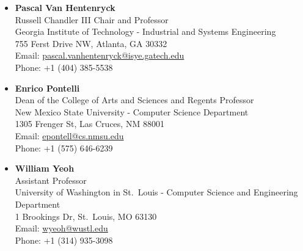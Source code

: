 

\begin{itemize}
\item \textbf{Pascal Van Hentenryck}\\ 
Russell Chandler III Chair and Professor\\
Georgia Institute of Technology - Industrial and Systems Engineering\\
755 Ferst Drive NW, Atlanta, GA 30332\\
Email: \url{pascal.vanhentenryck@isye.gatech.edu}\\
Phone: +1 (404) 385-5538

\item \textbf{Enrico Pontelli}\\ 
Dean of the College of Arts and Sciences and Regents Professor\\ 
New Mexico State University - Computer Science Department\\
1305 Frenger St, Las Cruces, NM 88001\\
Email: \url{epontell@cs.nmsu.edu}\\
Phone: +1 (575) 646-6239 

\item \textbf{William Yeoh}\\ 
Assistant Professor\\ 
University of Washington in St.~Louis - Computer Science and Engineering Department\\ 
1 Brookings Dr, St.~Louis, MO 63130\\
Email: \url{wyeoh@wustl.edu}\\
Phone: +1 (314) 935-3098



\end{itemize}
